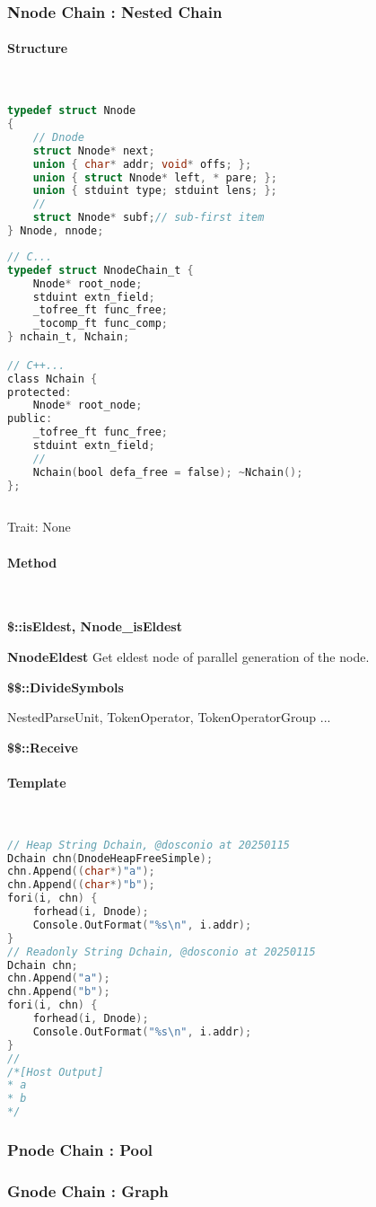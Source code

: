 \subsubsection{Nnode Chain : Nested Chain}

\paragraph{Structure} \

\lstset{style=GlobalC}
\begin{lstlisting}[language=C]
typedef struct Nnode
{
	// Dnode
	struct Nnode* next;
	union { char* addr; void* offs; };
	union { struct Nnode* left, * pare; };
	union { stduint type; stduint lens; };
	//
	struct Nnode* subf;// sub-first item
} Nnode, nnode;
\end{lstlisting}

\lstset{style=GlobalC}
\begin{lstlisting}[language=C]
// C...
typedef struct NnodeChain_t {
	Nnode* root_node;
	stduint extn_field;
	_tofree_ft func_free;
	_tocomp_ft func_comp;
} nchain_t, Nchain;

// C++...
class Nchain {
protected:
	Nnode* root_node;
public:
	_tofree_ft func_free;
	stduint extn_field;
	//
	Nchain(bool defa_free = false); ~Nchain();
};
	
\end{lstlisting}

Trait: None

\paragraph{Method} \


\textbf{\$::isEldest, Nnode\_isEldest}

\textbf{NnodeEldest}
Get eldest node of parallel generation of the node.

\textbf{\$\$::DivideSymbols}

NestedParseUnit, TokenOperator, TokenOperatorGroup ...


\textbf{\$\$::Receive}


\paragraph{Template} \

\lstset{style=GlobalCxx}
\begin{lstlisting}[language=C++]
// Heap String Dchain, @dosconio at 20250115
Dchain chn(DnodeHeapFreeSimple);
chn.Append((char*)"a");
chn.Append((char*)"b");
fori(i, chn) {
	forhead(i, Dnode);
	Console.OutFormat("%s\n", i.addr);
}
// Readonly String Dchain, @dosconio at 20250115
Dchain chn;
chn.Append("a");
chn.Append("b");
fori(i, chn) {
	forhead(i, Dnode);
	Console.OutFormat("%s\n", i.addr);
}
//
/*[Host Output]
* a
* b
*/
\end{lstlisting}

\subsubsection{Pnode Chain : Pool}

\subsubsection{Gnode Chain : Graph}


